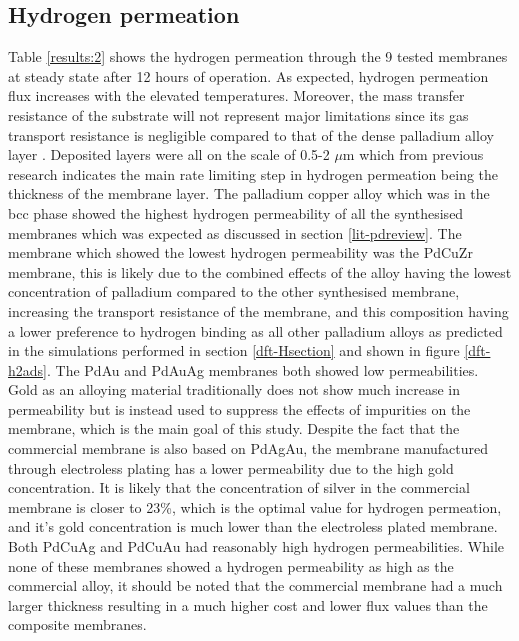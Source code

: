 \subsection{Hydrogen permeation}
Table \ref{results:2} shows the hydrogen permeation through the 9 tested membranes at steady state after 12 hours of operation. As expected, hydrogen permeation flux increases with the elevated temperatures. Moreover, the mass transfer resistance of the substrate will not represent major limitations since its gas transport resistance is negligible compared to that of the dense palladium alloy layer \cite{GouveiaGil2015}. Deposited layers were all on the scale of 0.5-2 $\mu$m which from previous research indicates the main rate limiting step in hydrogen permeation being the thickness of the membrane layer. \cite{NathanW.Ockwig2007a} The palladium copper alloy which was in the bcc phase showed the highest hydrogen permeability of all the synthesised membranes which was expected as discussed in section \ref{lit-pdreview}. The membrane which showed the lowest hydrogen permeability was the PdCuZr membrane, this is likely due to the combined effects of the alloy having the lowest concentration of palladium compared to the other synthesised membrane, increasing the transport resistance of the membrane, and this composition having a lower preference to hydrogen binding as all other palladium alloys as predicted in the simulations performed in section \ref{dft-Hsection} and shown in figure \ref{dft-h2ads}. The PdAu and PdAuAg membranes both showed low permeabilities. Gold as an alloying material traditionally does not show much increase in permeability \cite{Chen2010}  but is instead used to suppress the effects of impurities on the membrane, \cite{Chen2010} which is the main goal of this study. Despite the fact that the commercial membrane is also based on PdAgAu, the membrane manufactured through electroless plating has a lower permeability due to the high gold concentration. It is likely that the concentration of silver in the commercial membrane is closer to 23\%, which is the optimal value for hydrogen permeation, and it’s gold concentration is much lower than the electroless plated membrane. Both PdCuAg and PdCuAu had reasonably high hydrogen permeabilities. While none of these membranes showed a hydrogen permeability as high as the commercial alloy, it should be noted that the commercial membrane had a much larger thickness resulting in a much higher cost and lower flux values than the composite membranes. 

